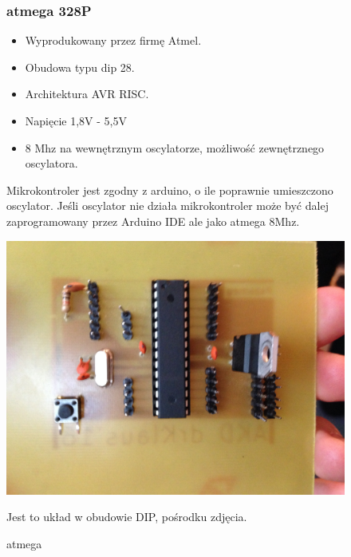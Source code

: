 \documentclass[a4paper,11pt]{article}
\def\SCALE{0.6}
\begin{document}
\begin{figure}[H]
	\subsubsection{atmega 328P}
		\begin{itemize}
			\item Wyprodukowany przez firmę Atmel.
			\item Obudowa typu dip 28.
			\item Architektura AVR RISC.
			\item Napięcie 1,8V - 5,5V
			\item 8 Mhz na wewnętrznym oscylatorze, możliwość zewnętrznego oscylatora.
		\end{itemize}
	Mikrokontroler jest zgodny z arduino, o ile poprawnie umieszczono oscylator. Jeśli oscylator nie działa mikrokontroler może być dalej zaprogramowany przez	Arduino IDE ale jako atmega 8Mhz.
	
	\centering
	\includegraphics[width=\SCALE
	\paperwidth]{plytkaGotowa}
	\caption{atmega}
	Jest to układ w obudowie DIP, pośrodku zdjęcia.
\end{figure}
\end{document}
